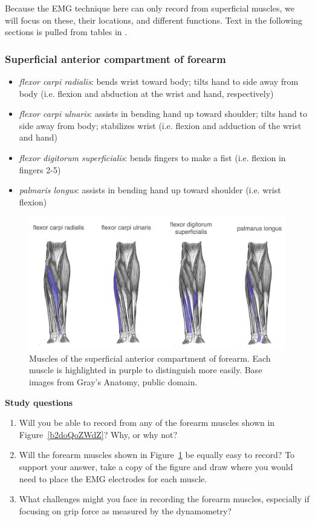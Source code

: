 \documentclass{article}
\begin{document}
Because the EMG technique here can only record from superficial muscles, we will focus on these, their locations, and different functions. Text in the following sections is pulled from tables in \citet{openStax_upper}.

\subsubsection{Superficial anterior compartment of forearm}

\begin{itemize}
\item \textit{flexor carpi radialis}: bends wrist toward body; tilts hand to side away from body (i.e. flexion and abduction at the wrist and hand, respectively)
\item \textit{flexor carpi ulnaris}: assists in bending hand up toward shoulder; tilts hand to side away from body; stabilizes wrist (i.e. flexion and adduction of the wrist and hand)
\item \textit{flexor digitorum superficialis}: bends fingers to make a fist (i.e. flexion in fingers 2-5)
\item \textit{palmaris longus}: assists in bending hand up toward shoulder (i.e. wrist flexion)
\end{itemize}

\begin{figure}[!htbp]
\centering
\includegraphics[width=0.9\linewidth]{files/EPpXta8zJdzN048lz8AR-4c33b2f18997f548f79509bf715e4771.png}
\caption[]{Muscles of the superficial anterior compartment of forearm. Each muscle is highlighted in purple to distinguish more easily. Base images from Gray's Anatomy, public domain.}
\label{ZPEeWRuWdh}
\end{figure}

\textbf{Study questions}

\begin{enumerate}
\item Will you be able to record from any of the forearm muscles shown in Figure~\ref{b2doQoZWdZ}? Why, or why not?
\item Will the forearm muscles shown in Figure~\ref{ZPEeWRuWdh} be equally easy to record? To support your answer, take a copy of the figure and draw where you would need to place the EMG electrodes for each muscle.
\item What challenges might you face in recording the forearm muscles, especially if focusing on grip force as measured by the dynamometry?
\end{enumerate}
\end{document}
